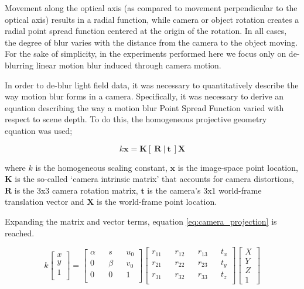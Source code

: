 Movement along the optical axis (as compared to movement perpendicular to the optical axis) results in a radial 
 function, while camera or object rotation creates a radial point spread function centered at the origin of the rotation.
In all cases, the degree of blur varies with the distance from the camera to the object moving.
For the sake of simplicity, in the experiments performed here we focus only on de-blurring linear motion blur induced through camera motion.

In order to de-blur light field data, it was necessary to quantitatively describe the way motion blur forms in a camera.
Specifically, it was necessary to derive an equation describing the way a motion blur Point Spread Function varied with respect to scene depth.
To do this, the homogeneous projective geometry equation was used;

\begin{equation}
\label{eq:camera_projection_unexpanded}
k \boldsymbol{x} = \boldsymbol{K} \left[~\boldsymbol{R}~|~\boldsymbol{t}~\right] \boldsymbol{X}
\end{equation}

where $k$ is the homogeneous scaling constant, $\boldsymbol{x}$ is the image-space point location, $\boldsymbol{K}$ is the so-called \enquote*{camera intrinsic matrix} that accounts for camera distortions, $\boldsymbol{R}$ is the 3x3 camera rotation matrix,  $\boldsymbol{t}$ is the camera's 3x1 world-frame translation vector and $\boldsymbol{X}$ is the world-frame point location.

Expanding the matrix and vector terms, equation \ref{eq:camera_projection} is reached.

\begin{equation}
\label{eq:camera_projection}
k
\begin{bmatrix}
x \\
y \\
1 \\
\end{bmatrix}
=
\begin{bmatrix}
\alpha && s && u_0 \\
0 && \beta && v_0 \\
0 && 0 && 1 \\
\end{bmatrix}
\begin{bmatrix}
r_{11} && r_{12} && r_{13} && t_x \\
r_{21} && r_{22} && r_{23} && t_y \\
r_{31} && r_{32} && r_{33} && t_z \\
\end{bmatrix}
\begin{bmatrix}
X \\
Y \\
Z \\
1
\end{bmatrix}
\end{equation}

